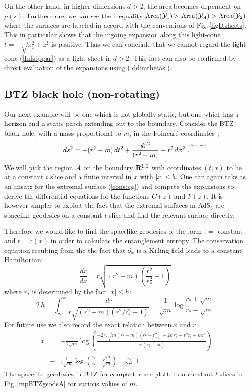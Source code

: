 \documentclass[12pt]{article}
\newcommand{\be}{\begin{equation}}
\newcommand{\ee}{\end{equation}}
\def\fig#1{Fig.\,\ref{#1}}
\def\req#1{(\ref{#1})}
\def\({\left (}
\def\){\right )}
\def\p{\partial}
\def\s{\sigma}
\def\CA{{\cal A}}
\def\CY{{\cal Y}}
\def\R{{\bf R}}
\def\p{\partial}
\def\f#1#2{{\frac{#1}{#2}}}
\def\f#1#2{{\frac{#1}{#2}}}
\def\p{\partial}
\def\Label#1{\label{#1}%
{ \color{blue}{\smash{\hbox to0pt{\raise2ex\hbox{\tiny[#1]}\hss}}}}}
\def\Lms{\CY}
\def\rA{\CA}
\def\area#1{{\rm Area}(#1)}
\def\ads#1{AdS$_{#1}$}
\def\s{\sqrt}
\def\f {\frac}
\def\no{\nonumber \\}
\def\ba{\begin{eqnarray}}
\def\ea{\end{eqnarray}}
\begin{document}
On the other hand, in higher dimensions $d>2$, the area becomes
dependent on $p(s)$. Furthermore, we can see the inequality
$\area{\Lms_1} > \area{\Lms_\rA} > \area{\Lms_2}$ where the surfaces are labeled in accord with the conventions of \fig{lightsheets}. This in particular shows that the ingoing expansion along this light-cone $t=-\s{x_1^2+z^2}$ is positive. Thus we can conclude that we cannot regard the light-cone \req{Infstppar} as a light-sheet in $d>2$. This fact can also be confirmed by direct evaluation of the
expansions using  \req{ddimthetas}.


\subsection{BTZ black hole (non-rotating)}
\label{btzbhex}
Our next example will be one which is
not globally static, but one which has a horizon and a static patch
extending out to the boundary.  Consider the BTZ black hole, with a
mass proportional to $m$, in the Poincar\'e coordinates
\cite{Banados:1992wn}, \cite{Aharony:1999ti}
%
\be
ds^2=-(r^2-m)\, dt^2+\f{dr^2}{(r^2-m)}+r^2\, dx^2 \ .
\Label{btzmet}
\ee
%
We will pick the region $\rA$ on the boundary $\R^{1,1}$ with coordinates $(t,x)$ to be at a constant $t$ slice and a finite interval in $x$ with $|x| \le h$. One can again take as an ansatz for the extremal surface \req{constcg} and compute the expansions to derive the differential equations for the functions $G(z)$ and $F(z)$. It is however simpler to exploit the fact that the extremal surfaces in \ads{3} are spacelike geodesics on a constant $t$ slice and find the relevant surface  directly.

Therefore we would like to find the spacelike geodesics of the form $t=$ constant and $r=r(x)$ in order to calculate the entanglement entropy. The conservation equation resulting from the the fact that $\p_x$ is a Killing field leads to a
constant Hamiltonian:
%
\be \f{dr}{dx}=r\s{\(r^2-m\)\, \(\f{r^2}{r^2_{*}}-1\)} \ .\ee
%
where $r_*$ is determined by the fact $|x| \le h$:
%
\be
2\, h=\int^\infty_{r_*}
\f{dr}{r\s{(r^2-m)(r^2/r^2_{*}-1)}}=\f{1}{\s{m}}\log\f{r_*+\s{m}}{r_*-\s{m}} \ .
\ee
%
For future  use we also record the exact relation between $x$ and $r$
%
\ba x&=&-\f{1}{2\s{m}}\log\left(\f{-2r_*\s{m(r^2-m)(r^2-r_*^2)}
-2mr_*^2+r^2r_*^2+mr^2}{r^2(r^2_*-m)}\right)\no
&=&\f{1}{2\s{m}}\log\left(\f{r_*+\s{m}}{r_*-\s{m}}\right)-\f{r_*}{2r^2}+\cdots \ea
%
The spacelike geodesics in BTZ for compact $x$ are plotted on
constant $t$ slices in \fig{mpBTZgeodsA} for various values of $m$.
\end{document}
